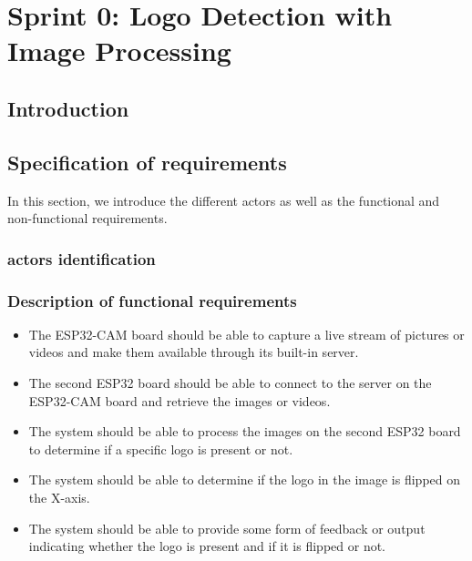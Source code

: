%
%


\chapter{Sprint 0: Logo Detection with Image Processing}

\section*{Introduction}
\section{Specification of requirements}
In this section, we introduce the different actors as well as the functional and non-functional requirements.
\subsection{actors identification }
\subsection{Description of functional requirements}
\begin{itemize}
\item The ESP32-CAM board should be able to capture a live stream of pictures or videos and make them available through its built-in server.
\item The second ESP32 board should be able to connect to the server on the ESP32-CAM board and retrieve the images or videos.
\item The system should be able to process the images on the second ESP32 board to determine if a specific logo is present or not.
\item The system should be able to determine if the logo in the image is flipped on the X-axis.
\item The system should be able to provide some form of feedback or output indicating whether the logo is present and if it is flipped or not.
\end{itemize}
